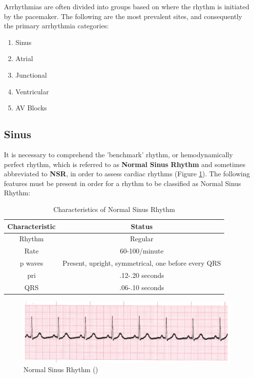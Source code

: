 Arrhythmias are often divided into groups based on where the rhythm is initiated by the pacemaker. The following are the most prevalent sites, and consequently the primary arrhythmia categories:

\begin{enumerate}
    \item Sinus
    \item Atrial
    \item Junctional
    \item Ventricular
    \item AV Blocks
\end{enumerate}

\subsection{Sinus}

It is necessary to comprehend the 'benchmark' rhythm, or hemodynamically perfect rhythm, which is referred to as \textbf{Normal Sinus Rhythm} and sometimes abbreviated to \textbf{NSR}, in order to assess cardiac rhythms (Figure \ref{fig:nsr}). The following features must be present in order for a rhythm to be classified as Normal Sinus Rhythm:

\begin{table}[H]
\begin{center}
\begin{tabular}{||c || c||}
 \hline
\textbf{Characteristic} & \textbf{Status} \\ [0.4ex] 
 \hline\hline
Rhythm & Regular \\
\hline
Rate & 60-100/minute \\
\hline
p waves & Present, upright, symmetrical, one before every QRS \\
\hline
pri & .12-.20 seconds \\
\hline
QRS & .06-.10 seconds \\
\hline\hline
\end{tabular}
\end{center}
\caption{Characteristics of Normal Sinus Rhythm}
\label{table:nsr_characteristics}
\end{table}


\begin{figure}[H]
\centering
\includegraphics[scale=0.65]{img/NSR.png}
\caption{Normal Sinus Rhythm (\cite{arryth_types})}
\label{fig:nsr}
\end{figure}
 
